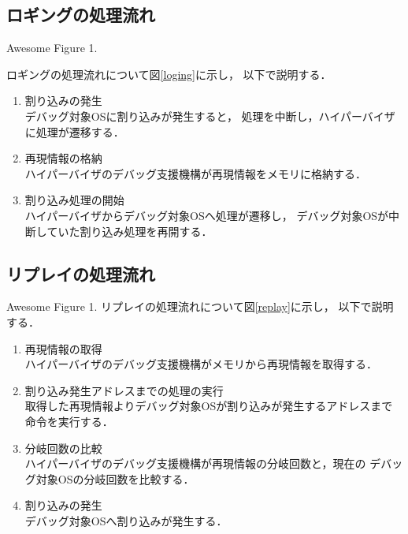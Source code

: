 \documentclass[tanilab-enum]{graduate}
\begin{document}
    \subsection{ロギングの処理流れ}
    {Awesome Figure 1.}

    ロギングの処理流れについて図\ref{loging}に示し，
    以下で説明する．
    \begin{enumerate}
        \item 割り込みの発生\\
            デバッグ対象OSに割り込みが発生すると，
            処理を中断し，ハイパーバイザに処理が遷移する．
        \item 再現情報の格納\\
            ハイパーバイザのデバッグ支援機構が再現情報をメモリに格納する．
        \item 割り込み処理の開始\\
            ハイパーバイザからデバッグ対象OSへ処理が遷移し，
            デバッグ対象OSが中断していた割り込み処理を再開する．
    \end{enumerate}
       \subsection{リプレイの処理流れ}
        {Awesome Figure 1.} 
        リプレイの処理流れについて図\ref{replay}に示し，
        以下で説明する．
                \begin{enumerate}
                    \item 再現情報の取得\\
                        ハイパーバイザのデバッグ支援機構がメモリから再現情報を取得する．
                    \item 割り込み発生アドレスまでの処理の実行\\
                        取得した再現情報よりデバッグ対象OSが割り込みが発生するアドレスまで
                        命令を実行する．
                    \item 分岐回数の比較\\
                        ハイパーバイザのデバッグ支援機構が再現情報の分岐回数と，現在の
                        デバッグ対象OSの分岐回数を比較する．
                    \item 割り込みの発生\\
                        デバッグ対象OSへ割り込みが発生する．
                \end{enumerate}
        
\end{document}

